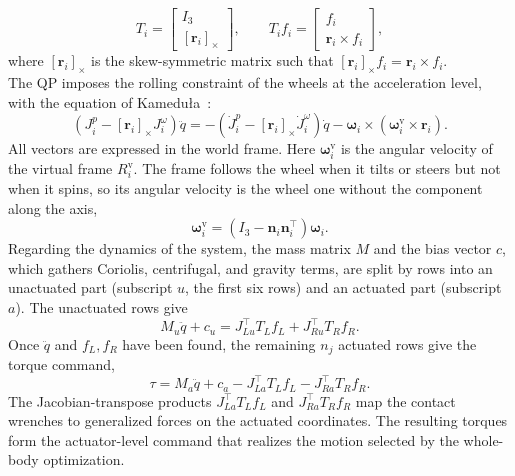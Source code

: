 \[
    T_i=\begin{bmatrix} I_3 \\ [\mathbf{r}_i]_{\times} \end{bmatrix},
    \qquad
    T_i f_i
    =
    \begin{bmatrix}
        f_i \\
        \mathbf{r}_i \times f_i
    \end{bmatrix},
\]
where $[\mathbf{r}_i]_{\times}$ is the skew-symmetric matrix such that
$[\mathbf{r}_i]_{\times}f_i=\mathbf{r}_i\times f_i$.\\
The QP imposes the rolling constraint of the wheels at the acceleration
level, with the equation of Kameduła~\cite{kamedula_centauro}:
\[
    \left(J_i^{p}-[\mathbf{r}_i]_{\times}J_i^{\omega}\right)\ddot{q}
    =
    -\left(\dot{J}_i^{p}-[\mathbf{r}_i]_{\times}\dot{J}_i^{\omega}\right)\dot{q}
    -\boldsymbol{\omega}_i\times\left(\boldsymbol{\omega}_i^{\mathrm{v}}\times\mathbf{r}_i\right).
\]
All vectors are expressed in the world frame. Here
$\boldsymbol{\omega}_i^{\mathrm{v}}$ is the angular velocity of the virtual
frame $R_i^{\mathrm{v}}$. The frame follows the wheel when it tilts or steers
but not when it spins, so its angular velocity is the wheel one without the
component along the axis,
\[
    \boldsymbol{\omega}_i^{\mathrm{v}}
    =\left(I_3-\mathbf{n}_i\mathbf{n}_i^{\top}\right)\boldsymbol{\omega}_i .
\]
Regarding the dynamics of the system, the mass matrix $M$ and the bias vector $c$, which gathers Coriolis, centrifugal, and
gravity terms, are split by rows into an unactuated part (subscript $u$, the
first six rows) and an actuated part (subscript $a$). The unactuated rows give
\[
    M_u\ddot{q}+c_u = J_{Lu}^{\top}T_Lf_L+J_{Ru}^{\top}T_Rf_R .
\]
Once $\ddot{q}$ and $f_L,f_R$ have been found, the remaining $n_j$ actuated
rows give the torque command,
\[
    \tau = M_a\ddot{q}+c_a-J_{La}^{\top}T_Lf_L-J_{Ra}^{\top}T_Rf_R.
\]
The Jacobian-transpose products $J_{La}^{\top}T_Lf_L$ and
$J_{Ra}^{\top}T_Rf_R$ map the contact wrenches to generalized forces on the
actuated coordinates. The resulting torques form the actuator-level command
that realizes the motion selected by the whole-body optimization.

